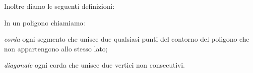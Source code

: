 \begin{inaccessibleblock}
\begin{center}\end{center}
\end{inaccessibleblock}

% 
% 

Inoltre diamo le seguenti definizioni:

\begin{definizione}
In un poligono chiamiamo:
\begin{itemize*}
\item \emph{corda} ogni segmento che unisce due qualsiasi punti del 
contorno del poligono che non appartengono allo stesso lato;
\item \emph{diagonale} ogni corda che unisce due vertici non 
consecutivi.
\end{itemize*}
\end{definizione}
\begin{inaccessibleblock}
\begin{center}\end{center}
\end{inaccessibleblock}

